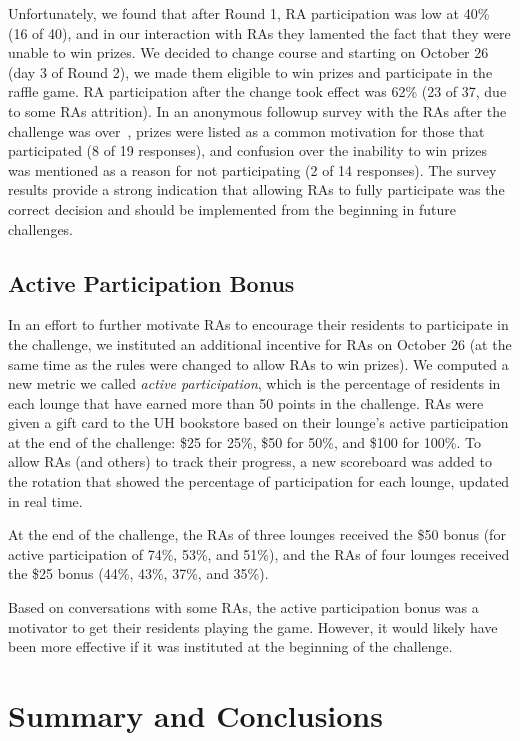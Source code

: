 Unfortunately, we found that after Round 1, RA participation was low at 40\% (16 of 40), and in our interaction with RAs they lamented the fact that they were unable to win prizes. We decided to change course and starting on October 26 (day 3 of Round 2), we made them eligible to win prizes and participate in the raffle game. RA participation after the change took effect was 62\% (23 of 37, due to some RAs attrition). In an anonymous followup survey with the RAs after the challenge was over~\cite{csdl2-11-08}, prizes were listed as a common motivation for those that participated (8 of 19 responses), and confusion over the inability to win prizes was mentioned as a reason for not participating (2 of 14 responses). The survey results provide a strong indication that allowing RAs to fully participate was the correct decision and should be implemented from the beginning in future challenges.


\subsection{Active Participation Bonus}
\label{sec:active-participation-bonus}

In an effort to further motivate RAs to encourage their residents to participate in the challenge, we instituted an additional incentive for RAs on October 26 (at the same time as the rules were changed to allow RAs to win prizes). We computed a new metric we called \emph{active participation}, which is the percentage of residents in each lounge that have earned more than 50 points in the challenge. RAs were given a gift card to the UH \Manoa bookstore based on their lounge's active participation at the end of the challenge: \$25 for 25\%, \$50 for 50\%, and \$100 for 100\%. To allow RAs (and others) to track their progress, a new scoreboard was added to the rotation that showed the percentage of participation for each lounge, updated in real time.

At the end of the challenge, the RAs of three lounges received the \$50 bonus (for active participation of 74\%, 53\%, and 51\%), and the RAs of four lounges received the \$25 bonus (44\%, 43\%, 37\%, and 35\%).

Based on conversations with some RAs, the active participation bonus was a motivator to get their residents playing the game. However, it would likely have been more effective if it was instituted at the beginning of the challenge.


\section{Summary and Conclusions}

